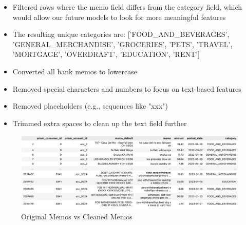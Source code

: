 \documentclass[12pt,letterpaper]{article}
\begin{document}
\begin{itemize}
    \item Filtered rows where the memo field differs from the category field, which would allow our future models to look for more meaningful features 
    \item The resulting unique categories are: ['FOOD\_AND\_BEVERAGES', 'GENERAL\_MERCHANDISE', 'GROCERIES', 'PETS', 'TRAVEL', 'MORTGAGE', 'OVERDRAFT', 'EDUCATION', 'RENT']
    \item Converted all bank memos to lowercase
    \item Removed special characters and numbers to focus on text-based features
    \item Removed placeholders (e.g., sequences like "xxx")
    \item Trimmed extra spaces to clean up the text field further
\end{itemize}
\begin{figure}[H]
    \centering
    \includegraphics[width=1.0\textwidth]{pngs/memo_clean.png}
    \caption{Original Memos vs Cleaned Memos}
    \label{fig:enter-label}
\end{figure}
\end{document}
